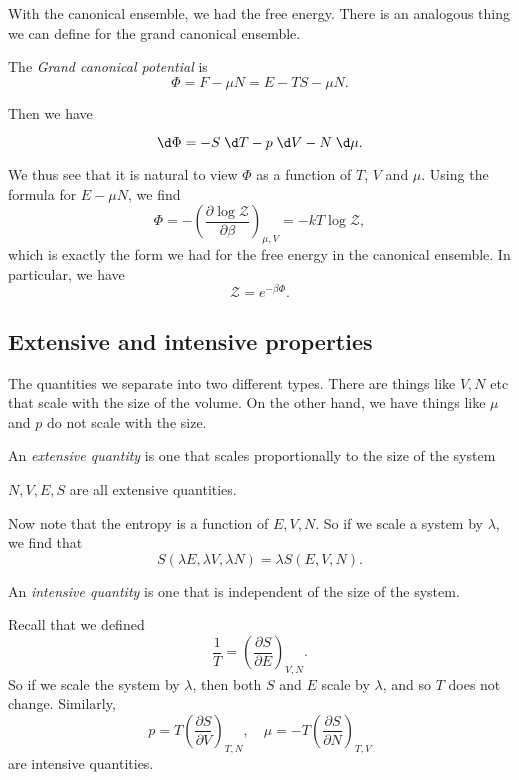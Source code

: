 \documentclass[a4paper]{article}
\begin{document}
With the canonical ensemble, we had the free energy. There is an analogous thing we can define for the grand canonical ensemble.
\begin{defi}\index{$\Phi$}
  The \emph{Grand canonical potential} is
  \[
    \Phi = F - \mu N = E - TS - \mu N.
  \]
\end{defi}
Then we have
\begin{prop}
  \[
    \d \Phi = - S \;\d T - p \;\d V - N \;\d \mu.
  \]
\end{prop}
We thus see that it is natural to view $\Phi$ as a function of $T$, $V$ and $\mu$. Using the formula for $E - \mu N$, we find
\[
  \Phi = - \left(\frac{\partial \log \mathcal{Z}}{ \partial \beta}\right)_{\mu, V} = -kT \log \mathcal{Z},
\]
which is exactly the form we had for the free energy in the canonical ensemble. In particular, we have
\[
  \mathcal{Z} = e^{-\beta \Phi}.
\]
\subsection{Extensive and intensive properties}
The quantities we separate into two different types. There are things like $V, N$ etc that scale with the size of the volume. On the other hand, we have things like $\mu$ and $p$ do not scale with the size.

\begin{defi}
  An \emph{extensive quantity} is one that scales proportionally to the size of the system
\end{defi}

\begin{eg}
  $N, V, E, S$ are all extensive quantities.
\end{eg}

Now note that the entropy is a function of $E, V, N$. So if we scale a system by $\lambda$, we find that
\[
  S(\lambda E, \lambda V, \lambda N) = \lambda S(E, V, N).
\]
\begin{defi}
  An \emph{intensive quantity} is one that is independent of the size of the system.
\end{defi}

\begin{eg}
  Recall that we defined
  \[
    \frac{1}{T} = \left(\frac{\partial S}{\partial E}\right)_{V, N}.
  \]
  So if we scale the system by $\lambda$, then both $S$ and $E$ scale by $\lambda$, and so $T$ does not change. Similarly,
  \[
    p = T \left(\frac{\partial S}{\partial V}\right)_{T, N},\quad \mu = -T \left(\frac{\partial S}{\partial N}\right)_{T, V}
  \]
  are intensive quantities.
\end{eg}
\end{document}
